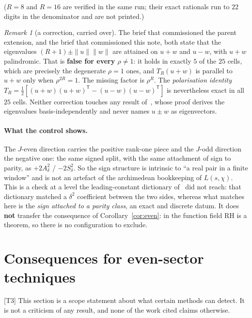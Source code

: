 \documentclass[11pt,a4paper]{article}
\theoremstyle{remark}
\newtheorem{remark}[theorem]{Remark}
\newcommand{\tier}[1]{{\small\textsf{[#1]}}}
\newcommand{\Ad}{A_\delta}
\newcommand{\Sd}{S_\delta}
\begin{document}


\noindent ($R=8$ and $R=16$ are verified in the same run; their exact rationals run to
$22$ digits in the denominator and are not printed.)

\begin{remark}[a correction, carried over]\label{rem:ffcorr}
The brief that commissioned the parent extension, and the brief that commissioned this
note, both state that the eigenvalues $(R+1)\pm\|u\|\|w\|$ are attained on $u+w$ and
$u-w$, with $u+w$ palindromic. That is \textbf{false for every $\rho\ne1$}: it holds in
exactly $5$ of the $25$ cells, which are precisely the degenerate $\rho=1$ ones, and
$T_R(u+w)$ is parallel to $u+w$ only when $\rho^{2R}=1$. The missing factor is $\rho^R$.
The \emph{polarisation identity}
$T_R=\tfrac12[(u+w)(u+w)^{\mathsf T}-(u-w)(u-w)^{\mathsf T}]$ is nevertheless exact in all
$25$ cells. Neither correction touches any result of~\cite{deltaL3}, whose proof derives
the eigenvalues basis-independently and never names $u\pm w$ as eigenvectors.
\end{remark}

\paragraph{What the control shows.} The $J$-even direction carries the positive rank-one
piece and the $J$-odd direction the negative one: the same signed split, with the same
attachment of sign to parity, as $+2\Ad^2$ / $-2\Sd^2$. So the sign structure is intrinsic
to ``a real pair in a finite window'' and is not an artefact of the archimedean bookkeeping
of $L(s,\chi)$. This is a check at a level the leading-constant dictionary of~\cite{deltaL3}
did not reach: that dictionary matched a $\delta^2$ coefficient between the two sides,
whereas what matches here is the \emph{sign attached to a parity class}, an exact and
discrete datum. It does \textbf{not} transfer the consequence of
Corollary~\ref{cor:even}: in the function field RH is a theorem, so there is no
configuration to exclude.

\section{Consequences for even-sector techniques}\label{sec:lit}

\tier{T3} This section is a scope statement about what certain methods can detect. It is
not a criticism of any result, and none of the work cited claims otherwise.
\end{document}
